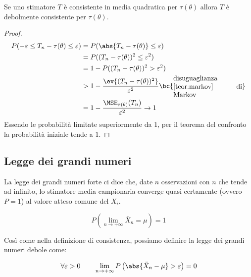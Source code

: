 
\begin{teor}
	Se uno stimatore $T$ è consistente in media quadratica per $\tau(\theta)$ allora $T$ è debolmente consistente per $\tau(\theta)$.
\end{teor}
\begin{proof}
	\begin{align*}
		P(-\varepsilon\leq T_n-\tau(\theta)\leq \varepsilon) & = P(\abs{T_n-\tau(\theta)}\leq\varepsilon)                                                                         \\
		                                                     & = P((T_n-\tau(\theta))^2\leq\varepsilon^2)                                                                         \\
		                                                     & = 1 - P((T_n-\tau(\theta))^2>\varepsilon^2)                                                                        \\
		                                                     & > 1-\frac{\ev{(T_n-\tau(\theta))^2}}{\varepsilon^2} \bc{\parbox{35mm}{disuguaglianza \ref{teor:markov} di Markov}} \\
		                                                     & = 1-\frac{\MSE_{\tau(\theta)}(T_n)}{\varepsilon^2} \to 1
	\end{align*}
	Essendo le probabilità limitate superiormente da $1$, per il teorema del confronto la probabilità iniziale tende a $1$.
\end{proof}


\subsection{Legge dei grandi numeri}
La legge dei grandi numeri forte ci dice che, date $n$ osservazioni con $n$ che tende ad infinito, lo stimatore media campionaria converge quasi certamente (ovvero $P = 1$) al valore atteso comune del $X_i$.
\begin{teor}
	\begin{equation*}
		P( \lim_{n\to+\infty} \bar X_n = \mu )= 1
	\end{equation*}
\end{teor}
Così come nella definizione di consistenza, possiamo definire la legge dei grandi numeri debole come:

\begin{teor}
	\begin{equation*}
		\forall\varepsilon > 0 \qquad \lim_{n\to+\infty} P\left(\abs{\bar X_n - \mu} > \varepsilon\right) = 0
	\end{equation*}
\end{teor}

